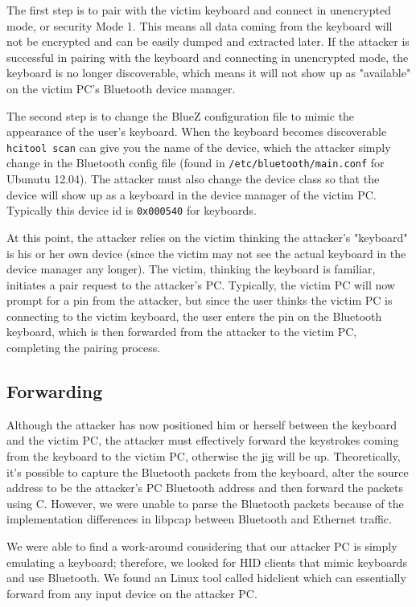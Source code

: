 \documentclass{acm_proc_article-sp}
\begin{document}
The first step is to pair with the victim keyboard and connect in unencrypted mode, or security Mode 1. This means all data coming from the keyboard will not be encrypted and can be easily dumped and extracted later. If the attacker is successful in pairing with the keyboard and connecting in unencrypted mode, the keyboard is no longer discoverable, which means it will not show up as "available" on the victim PC's Bluetooth device manager. 

The second step is to change the BlueZ configuration file to mimic the appearance of the user's keyboard. When the keyboard becomes discoverable \texttt{hcitool scan} can give you the name of the device, which the attacker simply change in the Bluetooth config file (found in \texttt{/etc/bluetooth/main.conf} for Ubunutu 12.04). The attacker must also change the device class so that the device will show up as a keyboard in the device manager of the victim PC. Typically this device id is \texttt{0x000540} for keyboards. 

At this point, the attacker relies on the victim thinking the attacker's "keyboard" is his or her own device (since the victim may not see the actual keyboard in the device manager any longer). The victim, thinking the keyboard is familiar, initiates a pair request to the attacker's PC. Typically, the victim PC will now prompt for a pin from the attacker, but since the user thinks the victim PC is connecting to the victim keyboard, the user enters the pin on the Bluetooth keyboard, which is then forwarded from the attacker to the victim PC, completing the pairing process. 

\subsection{Forwarding}
Although the attacker has now positioned him or herself between the keyboard and the victim PC, the attacker must effectively forward the keystrokes coming from the keyboard to the victim PC, otherwise the jig will be up.   
Theoretically, it's possible to capture the Bluetooth packets from the keyboard, alter the source address to be the attacker's PC Bluetooth address and then forward the packets using C. However, we were unable to parse the Bluetooth packets because of the implementation differences in libpcap between Bluetooth and Ethernet traffic. 

We were able to find a work-around considering that our attacker PC is simply emulating a keyboard; therefore, we looked for HID clients that mimic keyboards and use Bluetooth. We found an Linux tool called hidclient \cite{hidclient} which can essentially forward from any input device on the attacker PC. 
\end{document}

